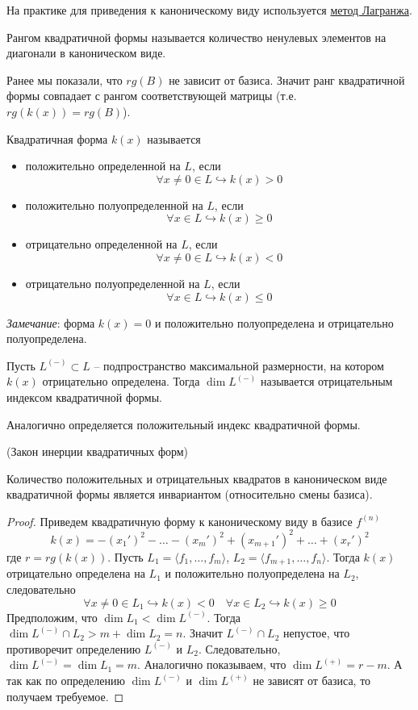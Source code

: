 На практике для приведения к каноническому виду используется \hyperref[Lagranj]{метод Лагранжа}.
\begin{definition}
    Рангом квадратичной формы называется количество ненулевых элементов на диагонали в каноническом виде.
\end{definition}
Ранее мы показали, что $rg(B)$ не зависит от базиса. Значит ранг квадратичной формы совпадает с рангом соответствующей матрицы (т.е. $rg(k(x))=rg(B)$).

\begin{definition}
    Квадратичная форма $k(x)$ называется 
    \begin{itemize}
        \item положительно определенной на $L$, если 
        \[
        \forall x\neq0 \in L \hookrightarrow k(x)>0
        \]
        \item положительно полуопределенной на $L$, если 
        \[\forall x \in L \hookrightarrow k(x)\geqslant 0\]
        \item отрицательно определенной на $L$, если 
        \[
        \forall x\neq0 \in L \hookrightarrow k(x)<0
        \]
        \item отрицательно полуопределенной на $L$, если 
        \[\forall x \in L \hookrightarrow k(x)\leqslant 0\]
    \end{itemize}
\end{definition}
\textit{Замечание}: форма $k(x)=0$ и положительно полуопределена и отрицательно полуопределена.

\begin{definition}
    Пусть $L^{(-)}\subset L$ -- подпространство максимальной размерности, на котором $k(x)$ отрицательно определена. Тогда $\dim L^{(-)}$ называется отрицательным индексом квадратичной формы.
    
    Аналогично определяется положительный индекс квадратичной формы.
\end{definition}
\begin{theorem} (Закон инерции квадратичных форм)

    Количество положительных и отрицательных квадратов в каноническом виде квадратичной формы является инвариантом (относительно смены базиса).
\end{theorem}
\begin{proof}
    Приведем квадратичную форму к каноническому виду в базисе $f^{(n)}$
    \[
    k(x)=-(x_1')^2-\dots-(x_m')^2+(x_{m+1}')^2+\dots+(x_r')^2
    \]
    где $r=rg(k(x))$. Пусть $L_1=\langle f_1, \dots, f_m \rangle$, $L_2=\langle f_{m+1}, \dots, f_n \rangle$. Тогда $k(x)$ отрицательно определена на $L_1$ и положительно полуопределена на $L_2$, следовательно \[
    \forall x\neq 0\in L_1 \hookrightarrow k(x)<0 \quad  \forall x \in L_2 \hookrightarrow k(x)\geqslant 0
    \]
    Предположим, что $\dim L_1 <\dim L^{(-)}$. Тогда $\dim L^{(-)}\cap L_2 > m+\dim L_2=n$. Значит $L^{(-)}\cap L_2$ непустое, что противоречит определению $L^{(-)}$ и $L_2$.
    Следовательно, $\dim L^{(-)}=\dim L_1=m$. Аналогично показываем, что $\dim L^{(+)} = r-m$. А так как по определению $\dim L^{(-)}$ и $\dim L^{(+)}$ не зависят от базиса, то получаем требуемое.
\end{proof}